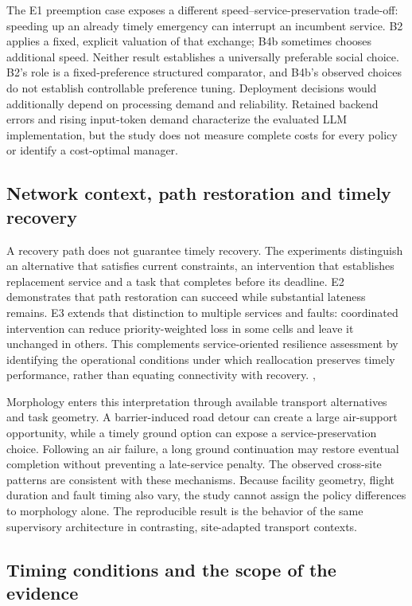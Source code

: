 \documentclass[]{interact}
\theoremstyle{plain}
\theoremstyle{definition}
\theoremstyle{remark}
\begin{document}
The E1 preemption case exposes a different speed--service-preservation trade-off: speeding up an already timely emergency can interrupt an incumbent service. B2 applies a fixed, explicit valuation of that exchange; B4b sometimes chooses additional speed. Neither result establishes a universally preferable social choice. B2's role is a fixed-preference structured comparator, and B4b's observed choices do not establish controllable preference tuning. Deployment decisions would additionally depend on processing demand and reliability. Retained backend errors and rising input-token demand characterize the evaluated LLM implementation, but the study does not measure complete costs for every policy or identify a cost-optimal manager.

\subsection{Network context, path restoration and timely recovery}

A recovery path does not guarantee timely recovery. The experiments distinguish an alternative that satisfies current constraints, an intervention that establishes replacement service and a task that completes before its deadline. E2 demonstrates that path restoration can succeed while substantial lateness remains. E3 extends that distinction to multiple services and faults: coordinated intervention can reduce priority-weighted loss in some cells and leave it unchanged in others. This complements service-oriented resilience assessment by identifying the operational conditions under which reallocation preserves timely performance, rather than equating connectivity with recovery. \citep{ref1}, \citep{ref3}

Morphology enters this interpretation through available transport alternatives and task geometry. A barrier-induced road detour can create a large air-support opportunity, while a timely ground option can expose a service-preservation choice. Following an air failure, a long ground continuation may restore eventual completion without preventing a late-service penalty. The observed cross-site patterns are consistent with these mechanisms. Because facility geometry, flight duration and fault timing also vary, the study cannot assign the policy differences to morphology alone. The reproducible result is the behavior of the same supervisory architecture in contrasting, site-adapted transport contexts.

\subsection{Timing conditions and the scope of the evidence}
\end{document}
